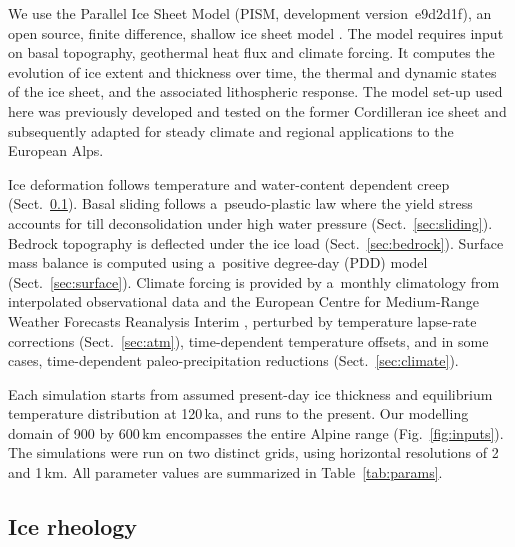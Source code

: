 \documentclass[tc, manuscript]{copernicus}
\begin{document}
    We use the Parallel Ice Sheet Model (PISM, development version~e9d2d1f), an
    open source, finite difference, shallow ice sheet model
    \citep{PISM-authors.2017}. The model requires input on basal
    topography, geothermal heat flux and climate forcing. It computes the
    evolution of ice extent and thickness over time, the thermal and dynamic
    states of the ice sheet, and the associated lithospheric response. The
    model set-up used here was previously developed and tested on the former
    Cordilleran ice sheet \citep{Seguinot.2014, Seguinot.etal.2014,
    Seguinot.etal.2016} and subsequently adapted for steady climate
    \citep{Becker.etal.2016} and regional \citep{Jouvet.etal.2017a}
    applications to the European Alps.

    Ice deformation follows temperature and water-content dependent creep
    (Sect.~\ref{sec:icedyn}). Basal sliding follows a~pseudo-plastic law where
    the yield stress accounts for till deconsolidation under high water
    pressure (Sect.~\ref{sec:sliding}). Bedrock topography is deflected
    under the ice load (Sect.~\ref{sec:bedrock}). Surface mass balance is
    computed using a~positive degree-day (PDD) model (Sect.~\ref{sec:surface}).
    Climate forcing is provided by a~monthly climatology from interpolated
    observational data \citep[WorldClim;][]{Hijmans.etal.2005} and the European
    Centre for Medium-Range Weather Forecasts Reanalysis Interim
    \citep[ERA-Interim;][]{Dee.etal.2011}, perturbed by temperature lapse-rate
    corrections (Sect.~\ref{sec:atm}), time-dependent temperature offsets, and
    in some cases, time-dependent paleo-precipitation reductions
    (Sect.~\ref{sec:climate}).

    Each simulation starts from assumed present-day ice thickness and
    equilibrium temperature distribution at 120\,\unit{ka}, and runs to the
    present. Our modelling domain of 900 by 600\,\unit{km} encompasses the
    entire Alpine range (Fig.~\ref{fig:inputs}). The simulations were run on
    two distinct grids, using horizontal resolutions of 2 and 1\,\unit{km}.
    All parameter values are summarized in Table~\ref{tab:params}.


\subsection{Ice rheology}
\label{sec:icedyn}
\end{document}
